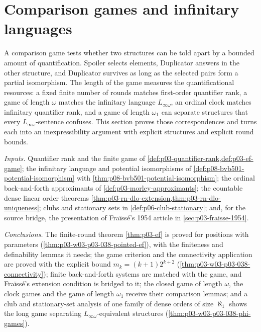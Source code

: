 \section{Comparison games and infinitary languages}
\label{sec:p03-w03-p03-038-comparison-games}

A comparison game tests whether two structures can be told apart by a
bounded amount of quantification. Spoiler selects elements, Duplicator
answers in the other structure, and Duplicator survives as long as the
selected pairs form a partial isomorphism. The length of the game measures
the quantificational resources: a fixed finite number of rounds matches
first-order quantifier rank, a game of length \(\omega\) matches the
infinitary language \(L_{\infty\omega}\), an ordinal clock matches
infinitary quantifier rank, and a game of length \(\omega_1\) can separate
structures that every \(L_{\infty\omega}\)-sentence confuses. This section
proves those correspondences and turns each into an inexpressibility
argument with explicit structures and explicit round bounds.

\emph{Inputs.} Quantifier rank and the finite game of
\cref{def:p03-quantifier-rank,def:p03-ef-game}; the infinitary language and
potential isomorphisms of \cref{def:p08-bvb501-potential-isomorphism} with
\cref{thm:p08-bvb501-potential-isomorphism}; the ordinal back-and-forth
approximants of \cref{def:p03-morley-approximants}; the countable dense
linear order theorems \cref{thm:p03-rn-dlo-extension,thm:p03-rn-dlo-uniqueness};
clubs and stationary sets in \cref{def:p06-club-stationary}; and, for the
source bridge, the presentation of Fra\"iss\'e's 1954 article in
\cref{sec:p03-fraisse-1954}.

\emph{Conclusions.} The finite-round theorem \cref{thm:p03-ef} is proved
for positions with parameters (\cref{thm:p03-w03-p03-038-pointed-ef}),
with the finiteness and definability lemmas it needs; the game criterion
and the connectivity application are proved with the explicit bound
\(m_k=(k+1)2^{k+2}\) (\cref{thm:p03-w03-p03-038-connectivity}); finite
back-and-forth systems are matched with the game, and Fra\"iss\'e's
extension condition is bridged to it; the closed game of length
\(\omega\), the clock games and the game of length \(\omega_1\) receive
their comparison lemmas; and a club and stationary-set analysis of one
family of dense orders of size \(\aleph_1\) shows the long game separating
\(L_{\infty\omega}\)-equivalent structures
(\cref{thm:p03-w03-p03-038-phi-games}).

